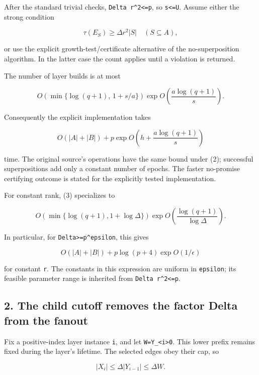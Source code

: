 After the standard trivial checks, \texttt{Delta\ r\^{}2\textless{}=p}, so \texttt{s\textless{}=U}. Assume either the strong condition

\[
\tau(E_S)\ge\Delta r^2 |S|
                    \quad(S\subseteq A),
 \tag{2}
\]

or use the explicit growth-test/certificate alternative of the no-superposition algorithm. In the latter case the count applies until a violation is returned.

The number of layer builds is at most

\[
O\!\left(\min\{\log(q+1),\,1+s/a\}\right)
        \exp O\!\left(\frac{a\log(q+1)}s\right).
 \tag{3}
\]

Consequently the explicit implementation takes

\[
O(|A|+|B|)+p\exp O\!\left(
             h+\frac{a\log(q+1)}s\right)
 \tag{4}
\]

time. The original source's operations have the same bound under (2); successful superpositions add only a constant number of epochs. The faster no-promise certifying outcome is stated for the explicitly tested implementation.

For constant rank, (3) specializes to

\[
O\!\left(\min\{\log(q+1),1+\log\Delta\}\right)
      \exp O\!\left(\frac{\log(q+1)}{\log\Delta}\right).
 \tag{5}
\]

In particular, for \texttt{Delta\textgreater{}=p\^{}epsilon}, this gives

\[
O(|A|+|B|)+p\log(p+4)\exp O(1/\epsilon)
 \tag{6}
\]

for constant \texttt{r}. The constants in this expression are uniform in \texttt{epsilon}; its feasible parameter range is inherited from \texttt{Delta\ r\^{}2\textless{}=p}.

\hypertarget{af-6a8212874a-the-child-cutoff-removes-the-factor-delta-from-the-fanout}{%
\subsection{2. The child cutoff removes the factor Delta from the fanout}\label{af-6a8212874a-the-child-cutoff-removes-the-factor-delta-from-the-fanout}}

Fix a positive-index layer instance \texttt{i}, and let \texttt{W=\textbar{}Y\_\textless{}i\textbar{}\textgreater{}0}. This lower prefix remains fixed during the layer's lifetime. The selected edges obey their cap, so

\[
|X_i|\le\Delta|Y_{i-1}|\le\Delta W.
\]

